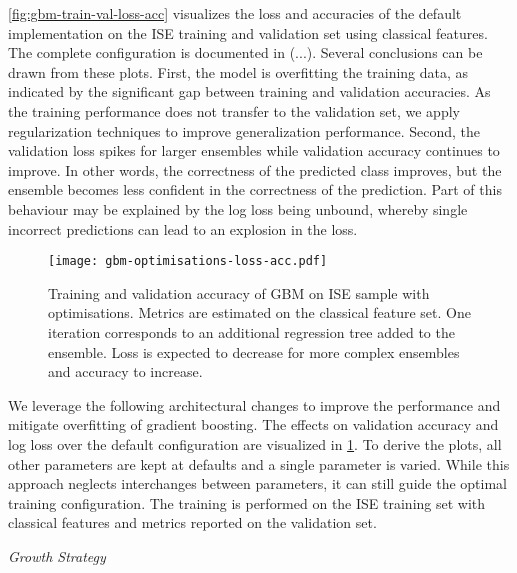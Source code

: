 \cref{fig:gbm-train-val-loss-acc} visualizes the loss and accuracies of the default implementation on the \gls{ISE} training and validation set using classical features. The complete configuration is documented in (...). Several conclusions can be drawn from these plots. First, the model is overfitting the training data, as indicated by the significant gap between training and validation accuracies. As the training performance does not transfer to the validation set, we apply regularization techniques to improve generalization performance. Second, the validation loss spikes for larger ensembles while validation accuracy continues to improve. In other words, the correctness of the predicted class improves, but the ensemble becomes less confident in the correctness of the prediction. Part of this behaviour may be explained by the log loss being unbound, whereby single incorrect predictions can lead to an explosion in the loss. 

\begin{figure}[ht]
    \centering
    \texttt{[image: gbm-optimisations-loss-acc.pdf]}
    \caption[Training and Validation Accuracy of  on \gls{ISE} with Optimisations]{Training and validation accuracy of \gls{GBM} on \gls{ISE} sample with optimisations. Metrics are estimated on the classical feature set. One iteration corresponds to an additional regression tree added to the ensemble. Loss is expected to decrease for more complex ensembles and accuracy to increase.}
    \label{fig:gbm-optimisations-loss-acc}
\end{figure}

We leverage the following architectural changes to improve the performance and mitigate overfitting of gradient boosting. The effects on validation accuracy and log loss over the default configuration are visualized in \cref{fig:gbm-optimisations-loss-acc}. To derive the plots, all other parameters are kept at defaults and a single parameter is varied. While this approach neglects interchanges between parameters, it can still guide the optimal training configuration. The training is performed on the ISE training set with classical features and metrics reported on the validation set.

\emph{Growth Strategy}

